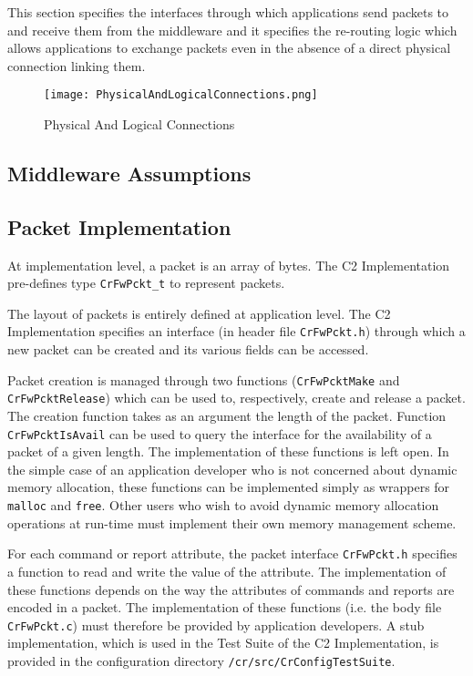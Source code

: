 \documentclass{pnp_article}
\begin{document}
This section specifies the interfaces through which applications send packets to and receive them from the middleware and it specifies the re-routing logic which allows applications to exchange packets even in the absence of a direct physical connection linking them. 

\begin{figure}[ht]
 \centering
 \texttt{[image: PhysicalAndLogicalConnections.png]}
 \caption{Physical And Logical Connections}
 \label{fig:PhysicalAndLogicalConnections}
\end{figure} 

\subsection{Middleware Assumptions}\label{sec:MwAssumptions}
 

\subsection{Packet Implementation}\label{sec:PcktImpl}

At implementation level, a packet is an array of bytes. The C2 Implementation pre-defines type \texttt{CrFwPckt\_t} to represent packets.

The layout of packets is entirely defined at application level. The C2 Implementation specifies an interface (in header file \texttt{CrFwPckt.h}) through which a new packet can be created and its various fields can be accessed. 

Packet creation is managed through two functions (\texttt{CrFwPcktMake} and \texttt{CrFwPcktRelease}) which can be used to, respectively, create and release a packet. The creation function takes as an argument the length of the packet. Function \texttt{CrFwPcktIsAvail} can be used to query the interface for the availability of a packet of a given length. The implementation of these functions is left open. In the simple case of an application developer who is not concerned about dynamic memory allocation, these functions can be implemented simply as wrappers for \texttt{malloc} and \texttt{free}. Other users who wish to avoid dynamic memory allocation operations at run-time must implement their own memory management scheme.

For each command or report attribute, the packet interface \texttt{CrFwPckt.h} specifies a function to read and write the value of the attribute. The implementation of these functions depends on the way the attributes of commands and reports are encoded in a packet. The implementation of these functions (i.e. the body file \texttt{CrFwPckt.c}) must therefore be provided by application developers. A stub implementation, which is used in the Test Suite of the C2 Implementation, is provided in the configuration directory \texttt{/cr/src/CrConfigTestSuite}.
\end{document}
